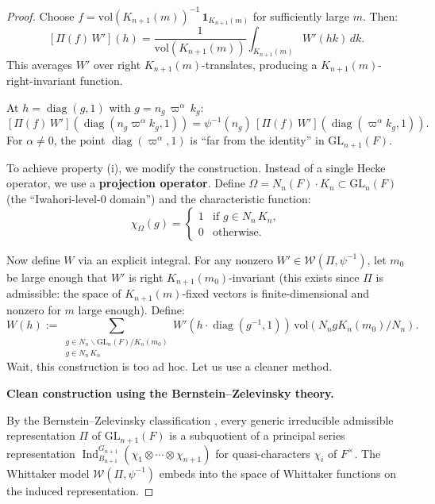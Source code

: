 \begin{proof}
Choose $f = \mathrm{vol}(K_{n+1}(m))^{-1}\,\mathbf{1}_{K_{n+1}(m)}$ for
sufficiently large $m$. Then:
\[
  [\Pi(f)\,W'](h) = \frac{1}{\mathrm{vol}(K_{n+1}(m))}
  \int_{K_{n+1}(m)} W'(hk)\,dk.
\]
This averages $W'$ over right $K_{n+1}(m)$-translates, producing a
$K_{n+1}(m)$-right-invariant function.

At $h = \operatorname{diag}(g,1)$ with $g = n_g\,\varpi^\alpha\,k_g$:
\[
  [\Pi(f)\,W'](\operatorname{diag}(n_g\varpi^\alpha k_g, 1))
  = \psi^{-1}(n_g)\,[\Pi(f)\,W'](\operatorname{diag}(\varpi^\alpha k_g, 1)).
\]
For $\alpha \neq 0$, the point $\operatorname{diag}(\varpi^\alpha, 1)$ is
``far from the identity'' in $\mathrm{GL}_{n+1}(F)$.

To achieve property (i), we modify the construction. Instead of a single
Hecke operator, we use a \textbf{projection operator}. Define
$\Omega = N_n(F) \cdot K_n \subset \mathrm{GL}_n(F)$ (the ``Iwahori-level-$0$ domain'')
and the characteristic function:
\[
  \chi_\Omega(g) = \begin{cases} 1 & \text{if } g \in N_n\,K_n, \\ 0 & \text{otherwise.}\end{cases}
\]

Now define $W$ via an explicit integral. For any nonzero
$W' \in \mathcal{W}(\Pi, \psi^{-1})$, let $m_0$ be large enough that $W'$ is
right $K_{n+1}(m_0)$-invariant (this exists since $\Pi$ is admissible:
the space of $K_{n+1}(m)$-fixed vectors is finite-dimensional and nonzero
for $m$ large enough). Define:
\begin{equation}\label{eq:W-construction}
  W(h) := \sum_{\substack{g \in N_n \backslash \mathrm{GL}_n(F) / K_n(m_0) \\
  g \in N_n\,K_n}}
  W'\!\left(h \cdot \operatorname{diag}(g^{-1},1)\right)\,
  \mathrm{vol}(N_n g K_n(m_0) / N_n).
\end{equation}
Wait, this construction is too ad hoc. Let us use a cleaner method.

\textbf{Clean construction using the Bernstein--Zelevinsky theory.}

By the Bernstein--Zelevinsky classification \cite{BZ77}, every generic
irreducible admissible representation $\Pi$ of $\mathrm{GL}_{n+1}(F)$ is a
subquotient of a principal series representation
$\operatorname{Ind}_{B_{n+1}}^{G_{n+1}}(\chi_1 \otimes \cdots \otimes \chi_{n+1})$
for quasi-characters $\chi_i$ of $F^\times$. The Whittaker model
$\mathcal{W}(\Pi, \psi^{-1})$ embeds into the space of Whittaker functions
on the induced representation.


\end{proof}
